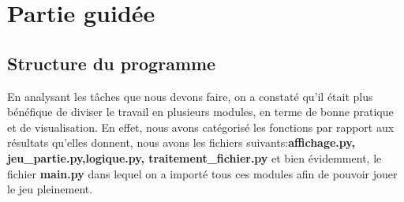 \section{Partie guidée}
	\subsection{Structure du programme}
En analysant les tâches que nous devons faire, on a constaté qu'il était plus bénéfique de diviser le travail en plusieurs modules, en terme de bonne pratique et de visualisation. En effet, nous avons catégorisé les fonctions par rapport aux résultats qu'elles donnent, nous avons les fichiers suivants:\textbf{affichage.py, jeu\_partie.py,logique.py, traitement\_fichier.py} et bien évidemment, le fichier \textbf{main.py} dans lequel on a importé tous ces modules afin de pouvoir jouer le jeu pleinement.